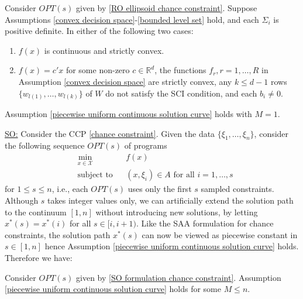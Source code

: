 \documentclass[mnsc,blindrev]{informs4} %
\newcommand{\R}{\mathbb{R}}
\begin{document}
\begin{theorem}\label{continuity of RO ellipsoidal}
Consider $OPT(s)$ given by \eqref{RO ellipsoid chance constraint}. Suppose Assumptions \ref{convex decision space}-\ref{bounded level set} hold, and each $\Sigma_i$ is positive definite. In either of the following two cases:
\begin{enumerate}
\item[i.]$f(x)$ is continuous and strictly convex.
\item[ii.]$f(x)=c'x$ for some non-zero $c\in\R^d$, the functions $f_r,r=1,\ldots,R$ in Assumption \ref{convex decision space} are strictly convex, any $k\leq d-1$ rows $\{w_{l(1)},\ldots,w_{l(k)}\}$ of $W$ do not satisfy the SCI condition, and each $b_i\neq 0$.
\end{enumerate}
Assumption \ref{piecewise uniform continuous solution curve} holds with $M=1$.
\end{theorem}

\smallskip

\noindent\underline{SO:} Consider the CCP \eqref{chance constraint}. Given the data $\{\xi_1,\ldots,\xi_n\}$, consider the following sequence $OPT(s)$ of programs
\begin{equation}\label{SO formulation chance constraint}
\begin{aligned}
    &\min_{x\in\mathcal X}&&f(x)\\
    &\text{subject to}&&(x,\xi_i)\in A\text{ for all }i=1,\ldots,s
\end{aligned}
\end{equation}
for $1\leq s\leq n$, i.e., each $OPT(s)$ uses only the first $s$ sampled constraints. Although $s$ takes integer values only, we can artificially extend the solution path to the continuum $[1,n]$ without introducing new solutions, by letting $x^*(s)=x^*(i)$ for all $s\in[i,i+1)$. Like the SAA formulation for chance constraints, the solution path $x^*(s)$ can now be viewed as piecewise constant in $s\in[1,n]$ hence Assumption \ref{piecewise uniform continuous solution curve} holds. Therefore we have:
\begin{theorem}
Consider $OPT(s)$ given by \eqref{SO formulation chance constraint}. Assumption \ref{piecewise uniform continuous solution curve} holds for some $M\leq n$.
\end{theorem}
\end{document}
